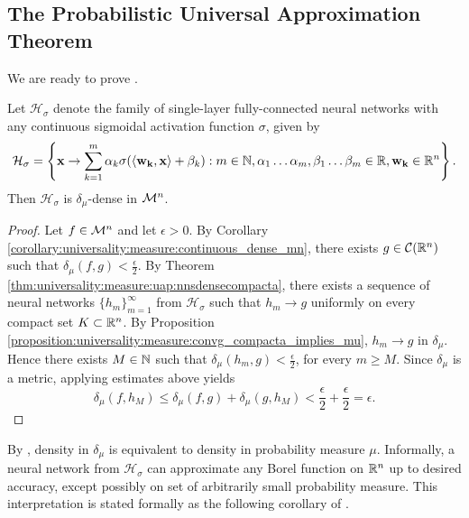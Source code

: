 \subsection{The Probabilistic Universal Approximation Theorem}
\label{subsection:universality:measure:probabilistic_uap}
We are ready to prove .
\begin{theorem}
\label{thm:universality:measure:uap:probabilistic}
Let $\mathcal{H}_{\sigma}$ denote the family of single-layer fully-connected neural networks with any continuous sigmoidal activation function $\sigma$, given by \begin{align*}
\mathcal{H}_{\sigma} = \left \{ \mathbf{x} \to \sum_{k=1}^{m} \alpha_k \sigma{\left (\langle \mathbf{w_k}, \mathbf{x} \rangle + \beta_k \right)} : m \in {\mathbb N}, \alpha_1 \ldots \alpha_m, \beta_1 \ldots \beta_m \in {\mathbb R}, \mathbf{w_k} \in {\mathbb R}^n \right \}.
\end{align*}
Then $\mathcal{H}_{\sigma}$ is $\delta_\mu$-dense in ${\mathcal M}^n$.
\end{theorem}
\begin{proof}
Let $f \in {\mathcal M}^n$ and let $\epsilon > 0$. By Corollary \ref{corollary:universality:measure:continuous_dense_mn}, there exists $g \in {\mathcal C}({\mathbb R}^n)$ such that $\delta_\mu(f, g) < \frac{\epsilon}{2}$. By Theorem \ref{thm:universality:measure:uap:nnsdensecompacta}, there exists a sequence of neural networks $\{ h_m \}_{m=1}^\infty$ from $\mathcal{H}_\sigma$ such that $h_m \to g$ uniformly on every compact set $K \subset {\mathbb R}^n$. By Proposition \ref{proposition:universality:measure:convg_compacta_implies_mu}, $h_m \to g$ in $\delta_\mu$. Hence there exists $M \in {\mathbb N}$ such that $\delta_\mu(h_m, g) < \frac{\epsilon}{2}$, for every $m \geq M$. Since $\delta_\mu$ is a metric, applying estimates above yields \[
  \delta_\mu(f, h_M) \leq \delta_\mu(f, g) + \delta_\mu(g, h_M) < \frac{\epsilon}{2} + \frac{\epsilon}{2} = \epsilon.
\]
\end{proof}
\begin{remark}
By , density in $\delta_\mu$ is equivalent to density in probability measure $\mu$.
Informally, a neural network from $\mathcal{H}_{\sigma}$ can approximate any Borel function on ${\mathbb R}^n$ up to desired accuracy, except possibly on set of arbitrarily small probability measure. This interpretation is stated formally as the following corollary of .
\end{remark}

